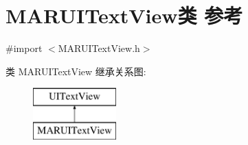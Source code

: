 \hypertarget{interface_m_a_r_u_i_text_view}{}\section{M\+A\+R\+U\+I\+Text\+View类 参考}
\label{interface_m_a_r_u_i_text_view}


{\ttfamily \#import $<$M\+A\+R\+U\+I\+Text\+View.\+h$>$}

类 M\+A\+R\+U\+I\+Text\+View 继承关系图\+:\begin{figure}[H]
\begin{center}
\leavevmode
\includegraphics[height=2.000000cm]{interface_m_a_r_u_i_text_view}
\end{center}
\end{figure}
